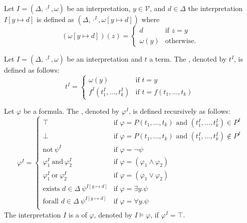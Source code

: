 Let $I=(\Delta,\cdot^I,\omega)$ be an interpretation, $y\in\mathcal{V}$, and $d\in\Delta$ the interpretation $I\left[y\mapsto d\right]$ is defined as $(\Delta,\cdot^I,\omega\left[y\mapsto d\right])$ where
\[(\omega\left[y\mapsto d\right])(z)=
	\begin{cases}
		d         & \text{if $z=y$}   \\
		\omega(y) & \text{otherwise.} 
	\end{cases}\]
\begin{definition}
	Let $I=(\Delta,\cdot^I,\omega)$ be an interpretation and $t$ a term. The , denoted by $t^I$, is defined as follows:
	\[t^I=
		\begin{cases}
			\omega(y)              & \text{if $t=y$}                \\
			f^I(t^I_1,\dots,t^I_k) & \text{if $t=f(t_1,\dots,t_k)$} 
		\end{cases}\]
		
	Let $\varphi$ be a formula. The , denoted by $\varphi^I$, is defined recursively as follows:
	\[\varphi^I=
		\begin{cases}
			\top                                                   & \text{if $\varphi=P(t_1,\dots,t_k)$ and $(t^I_1,\dots,t^I_k)\in P^I$}    \\
			\bot                                                   & \text{if $\varphi=P(t_1,\dots,t_k)$ and $(t^I_1,\dots,t^I_k)\notin P^I$} \\
			\text{not}~\psi^I                                      & \text{if $\varphi=\neg\psi$}                                             \\
			\varphi^I_1~\text{and}~\varphi^I_2                     & \text{if $\varphi=(\varphi_1\wedge\varphi_2)$}                           \\
			\varphi^I_1~\text{or}~\varphi^I_2                      & \text{if $\varphi=(\varphi_1\vee\varphi_2)$}                             \\
			\text{exists $d\in\Delta$}~\psi^{I\left[y\mapsto d\right]} & \text{if $\varphi=\exists y.\psi$}                                        \\
			\text{forall $d\in\Delta$}~\psi^{I\left[y\mapsto d\right]} & \text{if $\varphi=\forall y.\psi$}                                        \\
		\end{cases}\]
	The interpretation $I$ is a  of $\varphi$, denoted by $I\models\varphi$, if $\varphi^I=\top$.
\end{definition}
